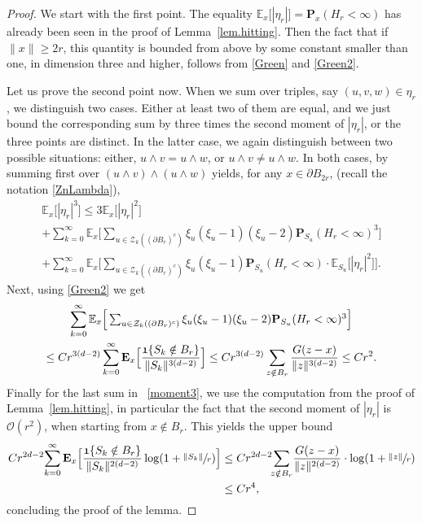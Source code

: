 \documentclass[11pt]{article}
\numberwithin{equation}{section}
\let\ts\textstyle
\theoremstyle{plain}
\theoremstyle{definition}
\newcommand{\1}{{\text{\Large $\mathfrak 1$}}}
\begin{document}
\begin{proof}
We start with the first point. The equality $\mathbb E_x\big[|\eta_r|\big]=\mathbf P_x(H_r<\infty)$ has already been seen in the proof of Lemma~\ref{lem.hitting}. Then the fact that if $\|x\|\ge 2r$, this quantity is bounded from above by some constant smaller than one, in dimension three and higher, follows from \eqref{Green} and \eqref{Green2}.

Let us prove the second point now. When we sum over triples, say $(u,v,w)\in \eta_r$, we distinguish two cases.
Either at least two of them are equal, and we just bound the corresponding sum by three times the second moment of $|\eta_r|$,
or the three points are distinct. In the latter case, we again
distinguish between two possible situations:
either, $u\wedge v = u\wedge w$, or $u\wedge v \neq u\wedge w$.
In both cases, by summing first over $(u\wedge v)\wedge(u\wedge w)$ yields,
for any $x\in \partial B_{2r}$, (recall the notation \eqref{ZnLambda}),
\begin{multline}\label{moment3}
\mathbb E_x\big[|\eta_r|^3\big]
\le 3\mathbb E_x\big[|\eta_r|^2\big]\\
+ \sum_{k=0}^\infty \mathbb E_x\Big[\ts
\sum_{u\in \mathcal Z_k((\partial B_r)^c)}
\xi_u(\xi_u-1)(\xi_u-2) \mathbf P_{S_u}(H_r <\infty)^3\Big]\\
+ \sum_{k=0}^\infty
\mathbb E_x\Big[\ts\sum_{u\in \mathcal Z_k((\partial B_r)^c)}
\xi_u(\xi_u-1) \mathbf P_{S_u}(H_r <\infty)\cdot \mathbb E_{S_u} \big[|\eta_r|^2\big] \Big].
\end{multline}
Next, using \eqref{Green2} we get
\begin{multline*}
\sum_{k=0}^\infty \mathbb E_x\Big[\ts\sum_{u\in \mathcal Z_k((\partial B_r)^c)}
\xi_u(\xi_u-1)(\xi_u-2) \mathbf P_{S_u}(H_r <\infty)^3\Big]\\
\le C r^{3(d-2)} \sum_{k=0}^\infty
\mathbf E_x\Big[\frac{\1\{S_k\notin B_r\}}{\|S_k\|^{3(d-2)}} \Big]\le Cr^{3(d-2)} \sum_{z\notin B_r} \frac{G(z-x)}{\|z\|^{3(d-2)}}\le Cr^2.
\end{multline*}
Finally for the last sum in ~\eqref{moment3}, we use the computation from the proof of Lemma~\ref{lem.hitting}, in particular the fact that
the second moment of $|\eta_r|$ is $\mathcal O(r^2)$, when starting from $x\notin B_r$.
This yields the upper bound
\begin{align*}
Cr^{2d-2}\!\sum_{k=0}^\infty \mathbf E_x\Big[\frac{\1\{S_k\notin B_r\}}{ \|S_k\|^{2(d-2)}}\log(1+\sfrac{\|S_k\|}{r}) \Big] &\le Cr^{2d-2}\!\!\sum_{z\notin B_r}\!
\frac{G(z-x)}{\|z\|^{2(d-2)}}\cdot \log (1+\sfrac{\|z\|}{r})\\
&\le Cr^4,
\end{align*}
concluding the proof of the lemma.
\end{proof}
\end{document}
